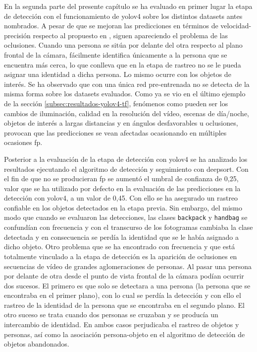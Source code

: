 En la segunda parte del presente capítulo se ha evaluado en primer lugar la etapa de detección con el funcionamiento de \gls{yolov4} sobre los distintos datasets antes nombrados. A pesar de que se mejoran las predicciones en términos de velocidad-precisión respecto al propuesto en \cite{valdivieso2018}, siguen apareciendo el problema de las oclusiones. Cuando una persona se sitúa por delante del otra respecto al plano frontal de la cámara, fácilmente identifica únicamente a la persona que se encuentra más cerca, lo que conlleva que en la etapa de rastreo no se le pueda asignar una identidad a dicha persona. Lo mismo ocurre con los objetos de interés. Se ha observado que con una única red pre-entrenada no se detecta de la misma forma sobre los datasets evaluados. Como ya se vio en el último ejemplo de la sección \ref{subsec:resultados-yolov4-tf}, fenómenos como pueden ser los cambios de iluminación, calidad en la resolución del vídeo, escenas de día/noche, objetos de interés a largas distancias y en ángulos desfavorables u oclusiones, provocan que las predicciones se vean afectadas ocasionando en múltiples ocasiones \gls{fp}.

Posterior a la evaluación de la etapa de detección con \gls{yolov4} se ha analizado los resultados ejecutando el algoritmo de detección y seguimiento con \gls{deepsort}. Con el fin de que no se producieran \gls{fp} se aumentó el umbral de confianza de 0,25, valor que se ha utilizado por defecto en la evaluación de las predicciones en la detección con \gls{yolov4}, a un valor de 0,45. Con ello se ha asegurado un rastreo confiable en los objetos detectados en la etapa previa. Sin embargo, del mismo modo que cuando se evaluaron las detecciones, las clases \texttt{backpack} y \texttt{handbag} se confundían con frecuencia y con el transcurso de los fotogramas cambiaba la clase detectada y en consecuencia se perdía la identidad que se le había asignado a dicho objeto. Otro problema que se ha encontrado con frecuencia y que está totalmente vinculado a la etapa de detección es la aparición de oclusiones en secuencias de vídeo de grandes aglomeraciones de personas. Al pasar una persona por delante de otra desde el punto de vista frontal de la cámara podían ocurrir dos sucesos. El primero es que solo se detectara a una persona (la persona que se encontraba en el primer plano), con lo cual se perdía la detección y con ello el rastreo de la identidad de la persona que se encontraba en el segundo plano. El otro suceso se trata cuando dos personas se cruzaban y se producía un intercambio de identidad. En ambos casos perjudicaba el rastreo de objetos y personas, así como la asociación persona-objeto en el algoritmo de detección de objetos abandonados.

